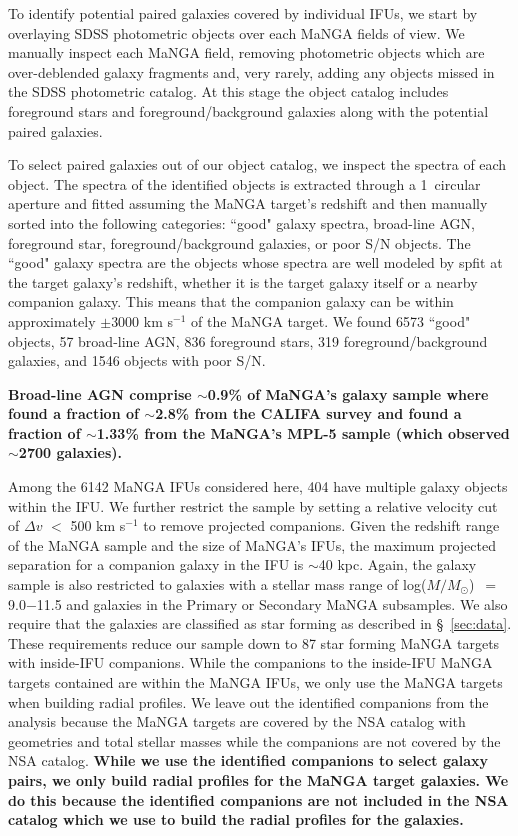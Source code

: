 \documentclass[iop,revtex4,twocolumn,apj,numberedappendix,appendixfloats]{emulateapj}
\newcommand{\logm}{log($M/M_{\odot}$)}
\begin{document}


To identify potential paired galaxies covered by individual IFUs, we start by overlaying SDSS photometric objects over each MaNGA fields of view. We manually inspect each MaNGA field, removing photometric objects which are over-deblended galaxy fragments and, very rarely, adding any objects missed in the SDSS photometric catalog. At this stage the object catalog includes foreground stars and foreground/background galaxies along with the potential paired galaxies. 

To select paired galaxies out of our object catalog, we inspect the spectra of each object. The spectra of the identified objects is extracted through a 1\arcsec\ circular aperture and fitted assuming the MaNGA target's redshift and then manually sorted into the following categories: ``good" galaxy spectra, broad-line AGN, foreground star, foreground/background galaxies, or poor S/N objects. The ``good" galaxy spectra are the objects whose spectra are well modeled by {\sc spfit} at the target galaxy's redshift, whether it is the target galaxy itself or a nearby companion galaxy. This means that the companion galaxy can be within approximately $\pm$3000 km s$^{-1}$ of the MaNGA target. We found 6573 ``good" objects, 57 broad-line AGN, 836 foreground stars, 319 foreground/background galaxies, and 1546 objects with poor S/N. 

\textbf{Broad-line AGN comprise $\sim$0.9\% of MaNGA's galaxy sample where \citet{Lacerda:2020} found a fraction of $\sim$2.8\% from the CALIFA survey and \citet{Sanchez:2018} found a fraction of $\sim$1.33\% from the MaNGA's MPL-5 sample (which observed $\sim$2700 galaxies).  
}

Among the 6142 MaNGA IFUs considered here, 404 have multiple galaxy objects within the IFU. We further restrict the sample by setting a relative velocity cut of $\Delta v$ $<$ 500 km s$^{-1}$ to remove projected companions. Given the redshift range of the MaNGA sample and the size of MaNGA's IFUs, the maximum projected separation for a companion galaxy in the IFU is $\sim$40 kpc. Again, the galaxy sample is also restricted to galaxies with a stellar mass range of \logm\ $=$ 9.0$-$11.5 and galaxies in the Primary or Secondary MaNGA subsamples. We also require that the galaxies are classified as star forming as described in \S~\ref{sec:data}. These requirements reduce our sample down to 87 star forming MaNGA targets with inside-IFU companions. While the companions to the inside-IFU MaNGA targets contained are within the MaNGA IFUs, we only use the MaNGA targets when building radial profiles. We leave out the identified companions from the analysis because the MaNGA targets are covered by the NSA catalog with geometries and total stellar masses while the companions are not covered by the NSA catalog. \textbf{While we use the identified companions to select galaxy pairs, we only build radial profiles for the MaNGA target galaxies. We do this because the identified companions are not included in the NSA catalog which we use to build the radial profiles for the galaxies.}
\end{document}
